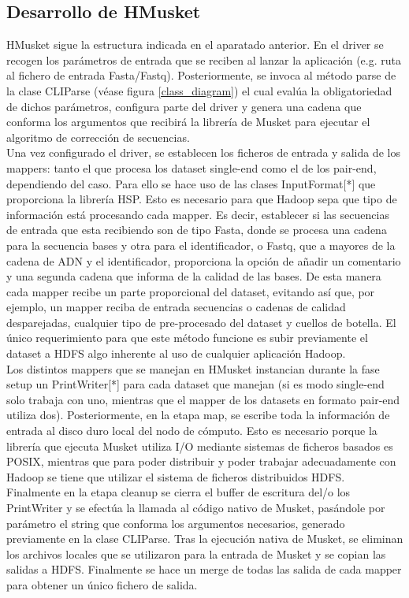 \documentclass[conference]{IEEEtran}
\begin{document}
\subsection{Desarrollo de HMusket}
HMusket sigue la estructura indicada en el aparatado anterior. En el driver se recogen los parámetros de entrada que se reciben al lanzar la aplicación (e.g. ruta al fichero de entrada Fasta/Fastq). Posteriormente, se invoca al método parse de la clase CLIParse (véase figura \ref{class_diagram}) el cual evalúa la obligatoriedad de dichos parámetros, configura parte del driver y genera una cadena que conforma los argumentos que recibirá la librería de Musket para ejecutar el algoritmo de corrección de secuencias.\\
Una vez configurado el driver, se establecen los ficheros de entrada y salida de los mappers: tanto el que procesa los dataset single-end como el de los pair-end, dependiendo del caso. Para ello se hace uso de las clases InputFormat[*] que proporciona la librería HSP. Esto es necesario para que Hadoop sepa que tipo de información está procesando cada mapper. Es decir, establecer si las secuencias de entrada que esta recibiendo son de tipo Fasta, donde se procesa una cadena para la secuencia bases y otra para el identificador, o Fastq, que a mayores de la cadena de ADN y el identificador, proporciona la opción de añadir un comentario y una segunda cadena que informa de la calidad de las bases. De esta manera cada mapper recibe un parte proporcional del dataset, evitando así que, por ejemplo, un mapper reciba de entrada secuencias o cadenas de calidad desparejadas, cualquier tipo de pre-procesado del dataset y cuellos de botella. El único requerimiento para que este método funcione es subir previamente el dataset a HDFS algo inherente al uso de cualquier aplicación Hadoop.\\

Los distintos mappers que se manejan en HMusket instancian durante la fase setup un PrintWriter[*] para cada dataset que manejan (si es modo single-end solo trabaja con uno, mientras que el mapper de los datasets en formato pair-end utiliza dos). Posteriormente, en la etapa map, se escribe toda la información de entrada al disco duro local del nodo de cómputo. Esto es necesario porque la librería que ejecuta Musket utiliza I/O mediante sistemas de ficheros basados es POSIX, mientras que para poder distribuir y poder trabajar adecuadamente con Hadoop se tiene que utilizar el sistema de ficheros distribuidos HDFS.\\
Finalmente en la etapa cleanup se cierra el buffer de escritura del/o los PrintWriter y se efectúa la llamada al código nativo de Musket, pasándole por parámetro el string que conforma los argumentos necesarios, generado previamente en la clase CLIParse. Tras la ejecución nativa de Musket, se eliminan los archivos locales que se utilizaron para la entrada de Musket y se copian las salidas a HDFS. Finalmente se hace un merge de todas las salida de cada mapper para obtener un único fichero de salida.\\
\end{document}
